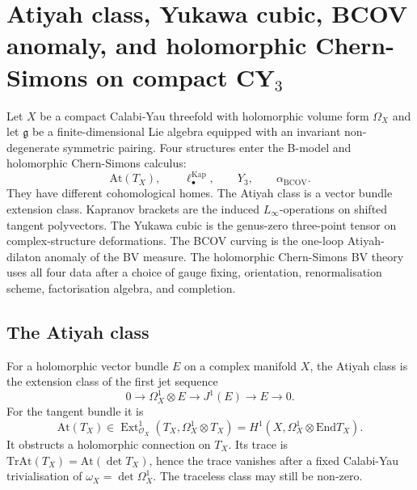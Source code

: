 \providecommand{\C}{\mathbb{C}}
\providecommand{\Z}{\mathbb{Z}}
\providecommand{\cO}{\mathcal{O}}
\providecommand{\fg}{\mathfrak{g}}
\providecommand{\At}{\mathrm{At}}
\providecommand{\End}{\mathrm{End}}
\providecommand{\Sym}{\mathrm{Sym}}
\providecommand{\Tr}{\mathrm{Tr}}
\providecommand{\PV}{\mathrm{PV}}
\providecommand{\BV}{\mathrm{BV}}
\providecommand{\BCOV}{\mathrm{BCOV}}
\providecommand{\hCS}{\mathrm{hCS}}
\providecommand{\kcat}{\kappa_{\mathrm{cat}}}
\providecommand{\kchHodge}{\kappa_{\mathrm{ch}}^{\mathrm{Hodge}}}
\providecommand{\kchHeis}{\kappa_{\mathrm{ch}}^{\mathrm{Heis}}}
\providecommand{\kchBCOV}{\kappa_{\mathrm{ch}}^{\mathrm{BCOV}}}
\providecommand{\kBKM}{\kappa_{\mathrm{BKM}}}
\providecommand{\kfiber}{\kappa_{\mathrm{fiber}}}

\section*{Atiyah class, Yukawa cubic, BCOV anomaly, and holomorphic
Chern-Simons on compact CY$_3$}
\label{sec:bcov-yukawa-hcs-cy3}

Let $X$ be a compact Calabi-Yau threefold with holomorphic volume form
$\Omega_X$ and let $\fg$ be a finite-dimensional Lie algebra equipped
with an invariant non-degenerate symmetric pairing. Four structures enter
the B-model and holomorphic Chern-Simons calculus:
\[
\At(T_X),\qquad
\ell_\bullet^{\mathrm{Kap}},\qquad
Y_3,\qquad
\alpha_{\BCOV}.
\]
They have different cohomological homes. The Atiyah class is a vector
bundle extension class. Kapranov brackets are the induced
$L_\infty$-operations on shifted tangent polyvectors. The Yukawa cubic is
the genus-zero three-point tensor on complex-structure deformations. The
BCOV curving is the one-loop Atiyah-dilaton anomaly of the BV measure.
The holomorphic Chern-Simons BV theory uses all four data after a choice
of gauge fixing, orientation, renormalisation scheme, factorisation
algebra, and completion.

\subsection*{The Atiyah class}
\label{subsec:bcov-yukawa-atiyah}

\begin{definition}
\label{def:bcov-yukawa-atiyah}
For a holomorphic vector bundle $E$ on a complex manifold $X$, the
Atiyah class is the extension class of the first jet sequence
\[
0\longrightarrow \Omega^1_X\otimes E
\longrightarrow J^1(E)
\longrightarrow E
\longrightarrow 0.
\]
For the tangent bundle it is
\[
\At(T_X)\in
\operatorname{Ext}^1_{\cO_X}(T_X,\Omega^1_X\otimes T_X)
=H^1(X,\Omega^1_X\otimes \End T_X).
\]
It obstructs a holomorphic connection on $T_X$. Its trace is
$\Tr\At(T_X)=\At(\det T_X)$, hence the trace vanishes after a fixed
Calabi-Yau trivialisation of $\omega_X=\det \Omega^1_X$. The traceless
class may still be non-zero.
\end{definition}

